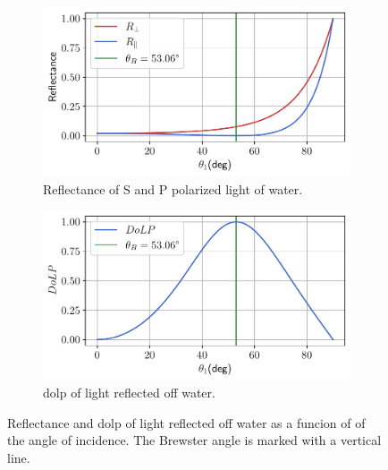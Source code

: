 \begin{figure}[H]
    \centering
    \begin{subfigure}{.5\textwidth}
        \centering

        \includegraphics[width=\textwidth]{figures/pol_plots/brewster0.pdf}
        \caption{Reflectance of S and P polarized light of water.}
        \label{fig:brewster0}
    \end{subfigure}%
    \begin{subfigure}{.5\textwidth}
        \centering
        \includegraphics[width=\textwidth]{figures/pol_plots/brewster1.pdf}
        \caption{\gls{dolp} of light reflected off water.}
        \label{fig:sub2}
    \end{subfigure}
    \caption{Reflectance and \gls{dolp} of light reflected off water as a funcion of of the angle of incidence. The Brewster angle is marked with a vertical line.}
    \label{fig:test}
\end{figure}





